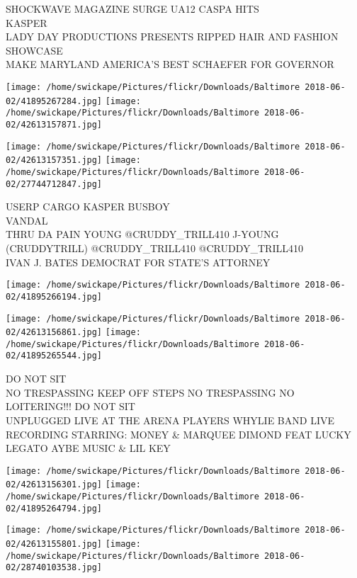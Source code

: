 \documentclass[10pt,letterpaper]{article}
\begin{document}
SHOCKWAVE MAGAZINE SURGE UA12 CASPA HITS\\
KASPER\\
LADY DAY PRODUCTIONS PRESENTS RIPPED HAIR AND FASHION SHOWCASE\\
MAKE MARYLAND AMERICA'S BEST SCHAEFER FOR GOVERNOR\\
\pagebreak

\texttt{[image: /home/swickape/Pictures/flickr/Downloads/Baltimore 2018-06-02/41895267284.jpg]}
\texttt{[image: /home/swickape/Pictures/flickr/Downloads/Baltimore 2018-06-02/42613157871.jpg]}

\texttt{[image: /home/swickape/Pictures/flickr/Downloads/Baltimore 2018-06-02/42613157351.jpg]}
\texttt{[image: /home/swickape/Pictures/flickr/Downloads/Baltimore 2018-06-02/27744712847.jpg]}

USERP CARGO KASPER BUSBOY\\
VANDAL\\
THRU DA PAIN YOUNG @CRUDDY\_TRILL410 J{-}YOUNG (CRUDDYTRILL) @CRUDDY\_TRILL410 @CRUDDY\_TRILL410\\
IVAN J. BATES DEMOCRAT FOR STATE'S ATTORNEY\\
\pagebreak

\texttt{[image: /home/swickape/Pictures/flickr/Downloads/Baltimore 2018-06-02/41895266194.jpg]}

\vspace{0.25in}
\texttt{[image: /home/swickape/Pictures/flickr/Downloads/Baltimore 2018-06-02/42613156861.jpg]}
\texttt{[image: /home/swickape/Pictures/flickr/Downloads/Baltimore 2018-06-02/41895265544.jpg]}

DO NOT SIT\\
NO TRESPASSING KEEP OFF STEPS NO TRESPASSING NO LOITERING!!! DO NOT SIT\\
UNPLUGGED LIVE AT THE ARENA PLAYERS WHYLIE BAND LIVE RECORDING STARRING: MONEY \& MARQUEE DIMOND FEAT LUCKY LEGATO AYBE MUSIC \& LIL KEY\\
\pagebreak

\texttt{[image: /home/swickape/Pictures/flickr/Downloads/Baltimore 2018-06-02/42613156301.jpg]}
\texttt{[image: /home/swickape/Pictures/flickr/Downloads/Baltimore 2018-06-02/41895264794.jpg]}

\texttt{[image: /home/swickape/Pictures/flickr/Downloads/Baltimore 2018-06-02/42613155801.jpg]}
\texttt{[image: /home/swickape/Pictures/flickr/Downloads/Baltimore 2018-06-02/28740103538.jpg]}
\end{document}
